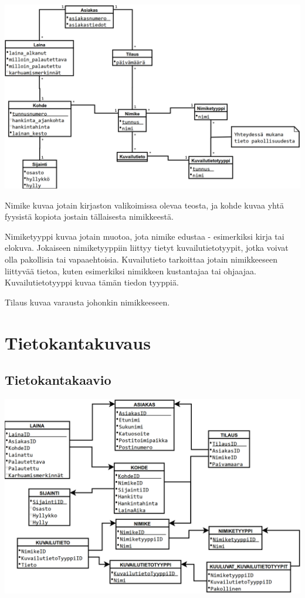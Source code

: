 \documentclass{article}
\begin{document}
\includegraphics[width=\linewidth]{../kaaviot/kasitekaavio.pdf}

Nimike kuvaa jotain kirjaston valikoimissa olevaa teosta, ja kohde kuvaa yhtä fyysistä kopiota jostain tällaisesta nimikkeestä.

Nimiketyyppi kuvaa jotain muotoa, jota nimike edustaa - esimerkiksi kirja tai elokuva. Jokaiseen nimiketyyppiin liittyy tietyt kuvailutietotyypit, jotka voivat olla pakollisia tai vapaaehtoisia. Kuvailutieto tarkoittaa jotain nimikkeeseen liittyvää tietoa, kuten esimerkiksi nimikkeen kustantajaa tai ohjaajaa. Kuvailutietotyyppi kuvaa tämän tiedon tyyppiä.

Tilaus kuvaa varausta johonkin nimikkeeseen.

\section{Tietokantakuvaus}

\subsection{Tietokantakaavio}

\includegraphics[width=\linewidth]{../kaaviot/tietokantakaavio.pdf}
\end{document}
